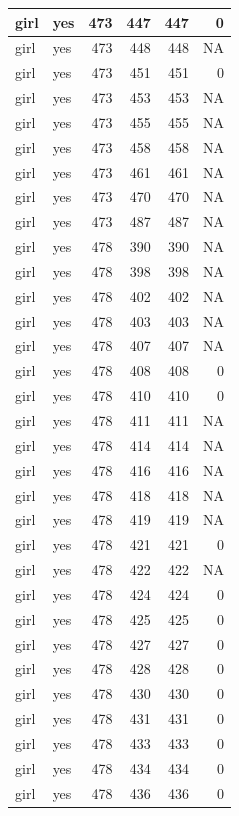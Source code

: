 \documentclass[man]{apa6}
\begin{document}
\begin{tabular}{l|l|r|r|r|r}
\hline
girl & yes & 473 & 447 & 447 & 0\\
\hline
girl & yes & 473 & 448 & 448 & NA\\
\hline
girl & yes & 473 & 451 & 451 & 0\\
\hline
girl & yes & 473 & 453 & 453 & NA\\
\hline
girl & yes & 473 & 455 & 455 & NA\\
\hline
girl & yes & 473 & 458 & 458 & NA\\
\hline
girl & yes & 473 & 461 & 461 & NA\\
\hline
girl & yes & 473 & 470 & 470 & NA\\
\hline
girl & yes & 473 & 487 & 487 & NA\\
\hline
girl & yes & 478 & 390 & 390 & NA\\
\hline
girl & yes & 478 & 398 & 398 & NA\\
\hline
girl & yes & 478 & 402 & 402 & NA\\
\hline
girl & yes & 478 & 403 & 403 & NA\\
\hline
girl & yes & 478 & 407 & 407 & NA\\
\hline
girl & yes & 478 & 408 & 408 & 0\\
\hline
girl & yes & 478 & 410 & 410 & 0\\
\hline
girl & yes & 478 & 411 & 411 & NA\\
\hline
girl & yes & 478 & 414 & 414 & NA\\
\hline
girl & yes & 478 & 416 & 416 & NA\\
\hline
girl & yes & 478 & 418 & 418 & NA\\
\hline
girl & yes & 478 & 419 & 419 & NA\\
\hline
girl & yes & 478 & 421 & 421 & 0\\
\hline
girl & yes & 478 & 422 & 422 & NA\\
\hline
girl & yes & 478 & 424 & 424 & 0\\
\hline
girl & yes & 478 & 425 & 425 & 0\\
\hline
girl & yes & 478 & 427 & 427 & 0\\
\hline
girl & yes & 478 & 428 & 428 & 0\\
\hline
girl & yes & 478 & 430 & 430 & 0\\
\hline
girl & yes & 478 & 431 & 431 & 0\\
\hline
girl & yes & 478 & 433 & 433 & 0\\
\hline
girl & yes & 478 & 434 & 434 & 0\\
\hline
girl & yes & 478 & 436 & 436 & 0\\

\end{tabular}
\end{document}
